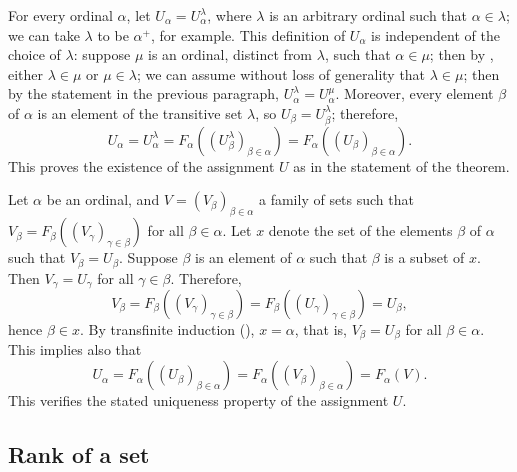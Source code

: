 \documentclass{article}
\begin{document}
For every ordinal \(\alpha\), let \(U_\alpha = U^\lambda_\alpha\),
where \(\lambda\) is an arbitrary ordinal such that
\(\alpha \in \lambda\); we can take \(\lambda\) to be \(\alpha^+\),
for example.  This definition of \(U_\alpha\) is independent of the
choice of \(\lambda\): suppose \(\mu\) is an ordinal, distinct from
\(\lambda\), such that \(\alpha \in \mu\); then by
, either \(\lambda \in \mu\) or
\(\mu \in \lambda\); we can assume without loss of generality that
\(\lambda \in \mu\); then by the statement in the previous paragraph,
\(U^\lambda_\alpha = U^\mu_\alpha\).  Moreover, every element
\(\beta\) of \(\alpha\) is an element of the transitive set
\(\lambda\), so \(U_\beta = U^\lambda_\beta\); therefore,
\begin{displaymath}
  U_\alpha = U^\lambda_\alpha =
  F_\alpha((U^\lambda_\beta)_{\beta \in \alpha}) =
  F_\alpha((U_\beta)_{\beta \in \alpha}).
\end{displaymath}
This proves the existence of the assignment \(U\) as in the statement
of the theorem.

Let \(\alpha\) be an ordinal, and \(V = (V_\beta)_{\beta \in \alpha}\)
a family of sets such that
\(V_\beta = F_\beta((V_\gamma)_{\gamma \in \beta})\) for all
\(\beta \in \alpha\).  Let \(x\) denote the set of the elements
\(\beta\) of \(\alpha\) such that \(V_\beta = U_\beta\).  Suppose
\(\beta\) is an element of \(\alpha\) such that \(\beta\) is a subset
of \(x\).  Then \(V_\gamma = U_\gamma\) for all \(\gamma \in \beta\).
Therefore,
\begin{displaymath}
  V_\beta = F_\beta((V_\gamma)_{\gamma \in \beta}) =
  F_\beta((U_\gamma)_{\gamma \in \beta}) = U_\beta,
\end{displaymath}
hence \(\beta \in x\).  By transfinite induction
(), \(x = \alpha\), that is, \(V_\beta = U_\beta\)
for all \(\beta \in \alpha\).  This implies also that
\begin{displaymath}
  U_\alpha = F_\alpha((U_\beta)_{\beta \in \alpha}) =
  F_\alpha((V_\beta)_{\beta \in \alpha}) = F_\alpha(V).
\end{displaymath}
This verifies the stated uniqueness property of the assignment \(U\).

\subsection{Rank of a set}
\label{sec:m3r76vpb}
\end{document}
